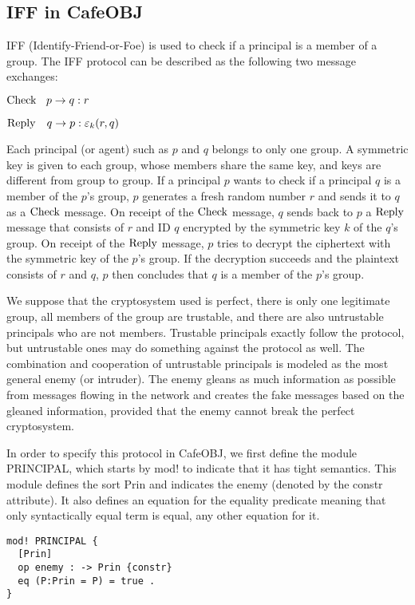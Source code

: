 \documentclass[a4paper,fleqn]{cas-dc}
\begin{document}
\subsection{IFF in CafeOBJ}
IFF (Identify-Friend-or-Foe) \cite{iff2001} is used to check if a principal is a member of a group. The IFF protocol can be described as the following two message exchanges:
	
	${\rm Check} \ \ \: p \rightarrow q : r$
	
	${\rm Reply}  \ \ \ q \rightarrow p : \varepsilon_k(r,q)$
	
	\noindent
Each principal (or agent) such as $p$ and $q$ belongs to only one group. A symmetric key is given to each group, whose members share the same key, and keys are different from group to group. If a principal $p$ wants to check if a principal $q$ is a member of the $p$'s group, $p$ generates a fresh random number $r$ and sends it to $q$ as a $\rm Check$ message. 
On receipt of the $\rm Check$ message, $q$ sends back to $p$ a $\rm Reply$ message that consists of $r$ and ID $q$ encrypted by the symmetric key $k$ of the $q$'s group. On receipt of the $\rm Reply$ message, $p$ tries to decrypt the ciphertext with the symmetric key of the $p$'s group. If the decryption succeeds and the plaintext consists of $r$ and $q$, $p$ then concludes that $q$ is a member of the $p$'s group. 
	
We suppose that the cryptosystem used is perfect, there is only one legitimate group, all members of the group are trustable, and there are also untrustable principals who are not members. Trustable principals exactly follow the protocol, but untrustable ones may do something against the protocol as well. The combination and cooperation of untrustable principals is modeled as the most general enemy (or intruder). The enemy gleans as much information as possible from messages flowing in the network and creates the fake messages based on the gleaned information, provided that the enemy cannot break the perfect cryptosystem.

In order to specify this protocol in CafeOBJ, we first define the module PRINCIPAL, which starts by mod! to indicate that it has tight semantics. This module defines the sort Prin and indicates the enemy (denoted by the constr attribute). It also defines an equation for the equality predicate meaning that only syntactically equal term is equal, any other equation for it.
\begin{small}
\begin{verbatim}
mod! PRINCIPAL {
  [Prin]
  op enemy : -> Prin {constr}
  eq (P:Prin = P) = true .
}
\end{verbatim}
\end{small}
\end{document}
